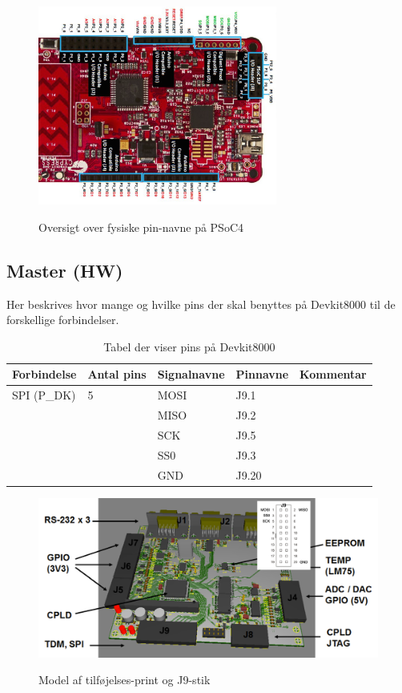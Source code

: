 \begin{figure}[H]
\centering
{\includegraphics[width=0.7\textwidth]{filer/design/Billeder/psoc4_pin}}
\caption{Oversigt over fysiske pin-navne på PSoC4}
\label{lab:psoc4_pin}
\end{figure}

\newpage
\begin{table}[H]
\subsection{Master (HW)}
Her beskrives hvor mange og hvilke pins der skal benyttes på Devkit8000 til de forskellige forbindelser.
\caption{Tabel der viser pins på Devkit8000}
\begin{small}
\begin{tabular}{|p{}|p{2cm}|p{}|p{}|p{2.6cm}|}
\hline

\textbf{Forbindelse}	&\textbf{Antal pins} 	&\textbf{Signalnavne} &\textbf{Pinnavne} &\textbf{Kommentar}  \\ \hline

SPI 	(P\_DK)			&5 						&MOSI				&J9.1		&					\\\cline{3-4}
					&						&MISO				&J9.2		&					\\\cline{3-4}
					&						&SCK					&J9.5		&					\\\cline{3-4}
					&						&SS0					&J9.3		&					\\\cline{3-4}					
					&						&GND					&J9.20		&					\\\hline

\end{tabular}
\end{small}
\label{table:master_forbindelse}
\end{table}

\begin{figure}[H]
\centering
{\includegraphics[width=\textwidth]{filer/design/Billeder/devkit_j9}}
\caption{Model af tilføjelses-print og J9-stik }
\label{lab:devkit_j9}
\end{figure}